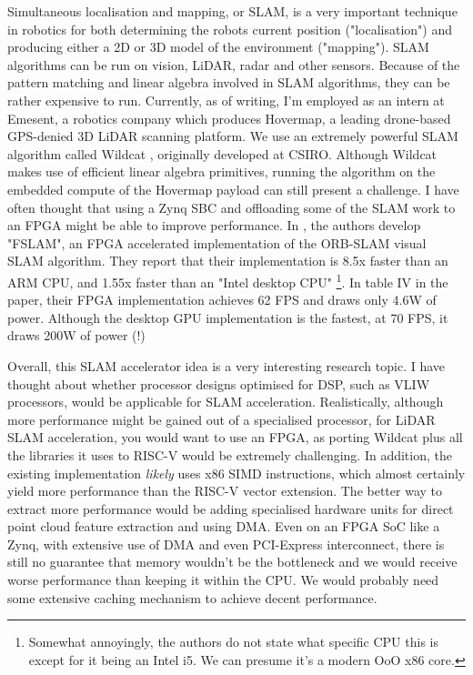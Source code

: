 \documentclass[12pt]{article}
\begin{document}
Simultaneous localisation and mapping, or SLAM, is a very important technique in robotics for both determining
the robots current position ("localisation") and producing either a 2D or 3D model of the environment
("mapping"). SLAM algorithms can be run on vision, LiDAR, radar and other sensors. Because of the pattern
matching and linear algebra involved in SLAM algorithms, they can be rather expensive to run. Currently, as of
writing, I'm employed as an intern at Emesent, a robotics company which produces Hovermap, a leading drone-based
GPS-denied 3D LiDAR scanning platform. We use an extremely powerful SLAM algorithm called Wildcat \cite{ramezani2022wildcat}, 
originally developed at CSIRO. Although Wildcat makes use of efficient linear algebra
primitives, running the algorithm on the embedded compute of the Hovermap payload can still present a
challenge. I have often thought that using a Zynq SBC and offloading some of the SLAM work to an FPGA might be
able to improve performance. In \cite{Vemulapati2022}, the authors develop "FSLAM", an FPGA accelerated
implementation of the ORB-SLAM visual SLAM algorithm. They report that their implementation is 8.5x faster
than an ARM CPU, and 1.55x faster than an "Intel desktop CPU" \footnote{Somewhat annoyingly, the authors do
not state what specific CPU this is except for it being an Intel i5. We can presume it's a modern OoO x86
core.}. In table IV in the paper, their FPGA implementation achieves 62 FPS and draws only 4.6W of power.
Although the desktop GPU implementation is the fastest, at 70 FPS, it draws 200W of power (!)

Overall, this SLAM accelerator idea is a very interesting research topic. I have thought about whether
processor designs optimised for DSP, such as VLIW processors, would be applicable for SLAM acceleration. 
Realistically, although more performance might be gained out of a specialised processor, for LiDAR SLAM
acceleration, you would want to use an FPGA, as porting Wildcat plus all the libraries it uses to RISC-V would
be extremely challenging. In addition, the existing implementation \textit{likely} uses x86 SIMD instructions,
which almost certainly yield more performance than the RISC-V vector extension. The better way to extract more
performance would be adding specialised hardware units for direct point cloud feature extraction and using
DMA. Even on an FPGA SoC like a Zynq, with extensive use of DMA and even PCI-Express interconnect, there is
still no guarantee that memory wouldn't be the bottleneck and we would receive worse performance than keeping
it within the CPU. We would probably need some extensive caching mechanism to achieve decent performance.
\end{document}
